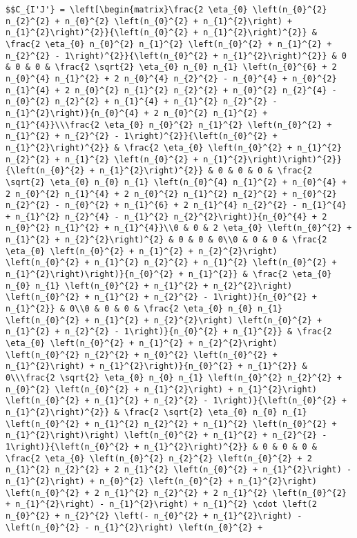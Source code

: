 \documentclass[
  letterpaper,
  DIV=11,
  numbers=noendperiod]{scrreprt}
\begin{document}
\begin{verbatim}
$$C_{I'J'} = \left[\begin{matrix}\frac{2 \eta_{0} \left(n_{0}^{2} n_{2}^{2} + n_{0}^{2} \left(n_{0}^{2} + n_{1}^{2}\right) + n_{1}^{2}\right)^{2}}{\left(n_{0}^{2} + n_{1}^{2}\right)^{2}} & \frac{2 \eta_{0} n_{0}^{2} n_{1}^{2} \left(n_{0}^{2} + n_{1}^{2} + n_{2}^{2} - 1\right)^{2}}{\left(n_{0}^{2} + n_{1}^{2}\right)^{2}} & 0 & 0 & 0 & \frac{2 \sqrt{2} \eta_{0} n_{0} n_{1} \left(n_{0}^{6} + 2 n_{0}^{4} n_{1}^{2} + 2 n_{0}^{4} n_{2}^{2} - n_{0}^{4} + n_{0}^{2} n_{1}^{4} + 2 n_{0}^{2} n_{1}^{2} n_{2}^{2} + n_{0}^{2} n_{2}^{4} - n_{0}^{2} n_{2}^{2} + n_{1}^{4} + n_{1}^{2} n_{2}^{2} - n_{1}^{2}\right)}{n_{0}^{4} + 2 n_{0}^{2} n_{1}^{2} + n_{1}^{4}}\\\frac{2 \eta_{0} n_{0}^{2} n_{1}^{2} \left(n_{0}^{2} + n_{1}^{2} + n_{2}^{2} - 1\right)^{2}}{\left(n_{0}^{2} + n_{1}^{2}\right)^{2}} & \frac{2 \eta_{0} \left(n_{0}^{2} + n_{1}^{2} n_{2}^{2} + n_{1}^{2} \left(n_{0}^{2} + n_{1}^{2}\right)\right)^{2}}{\left(n_{0}^{2} + n_{1}^{2}\right)^{2}} & 0 & 0 & 0 & \frac{2 \sqrt{2} \eta_{0} n_{0} n_{1} \left(n_{0}^{4} n_{1}^{2} + n_{0}^{4} + 2 n_{0}^{2} n_{1}^{4} + 2 n_{0}^{2} n_{1}^{2} n_{2}^{2} + n_{0}^{2} n_{2}^{2} - n_{0}^{2} + n_{1}^{6} + 2 n_{1}^{4} n_{2}^{2} - n_{1}^{4} + n_{1}^{2} n_{2}^{4} - n_{1}^{2} n_{2}^{2}\right)}{n_{0}^{4} + 2 n_{0}^{2} n_{1}^{2} + n_{1}^{4}}\\0 & 0 & 2 \eta_{0} \left(n_{0}^{2} + n_{1}^{2} + n_{2}^{2}\right)^{2} & 0 & 0 & 0\\0 & 0 & 0 & \frac{2 \eta_{0} \left(n_{0}^{2} + n_{1}^{2} + n_{2}^{2}\right) \left(n_{0}^{2} + n_{1}^{2} n_{2}^{2} + n_{1}^{2} \left(n_{0}^{2} + n_{1}^{2}\right)\right)}{n_{0}^{2} + n_{1}^{2}} & \frac{2 \eta_{0} n_{0} n_{1} \left(n_{0}^{2} + n_{1}^{2} + n_{2}^{2}\right) \left(n_{0}^{2} + n_{1}^{2} + n_{2}^{2} - 1\right)}{n_{0}^{2} + n_{1}^{2}} & 0\\0 & 0 & 0 & \frac{2 \eta_{0} n_{0} n_{1} \left(n_{0}^{2} + n_{1}^{2} + n_{2}^{2}\right) \left(n_{0}^{2} + n_{1}^{2} + n_{2}^{2} - 1\right)}{n_{0}^{2} + n_{1}^{2}} & \frac{2 \eta_{0} \left(n_{0}^{2} + n_{1}^{2} + n_{2}^{2}\right) \left(n_{0}^{2} n_{2}^{2} + n_{0}^{2} \left(n_{0}^{2} + n_{1}^{2}\right) + n_{1}^{2}\right)}{n_{0}^{2} + n_{1}^{2}} & 0\\\frac{2 \sqrt{2} \eta_{0} n_{0} n_{1} \left(n_{0}^{2} n_{2}^{2} + n_{0}^{2} \left(n_{0}^{2} + n_{1}^{2}\right) + n_{1}^{2}\right) \left(n_{0}^{2} + n_{1}^{2} + n_{2}^{2} - 1\right)}{\left(n_{0}^{2} + n_{1}^{2}\right)^{2}} & \frac{2 \sqrt{2} \eta_{0} n_{0} n_{1} \left(n_{0}^{2} + n_{1}^{2} n_{2}^{2} + n_{1}^{2} \left(n_{0}^{2} + n_{1}^{2}\right)\right) \left(n_{0}^{2} + n_{1}^{2} + n_{2}^{2} - 1\right)}{\left(n_{0}^{2} + n_{1}^{2}\right)^{2}} & 0 & 0 & 0 & \frac{2 \eta_{0} \left(n_{0}^{2} n_{2}^{2} \left(n_{0}^{2} + 2 n_{1}^{2} n_{2}^{2} + 2 n_{1}^{2} \left(n_{0}^{2} + n_{1}^{2}\right) - n_{1}^{2}\right) + n_{0}^{2} \left(n_{0}^{2} + n_{1}^{2}\right) \left(n_{0}^{2} + 2 n_{1}^{2} n_{2}^{2} + 2 n_{1}^{2} \left(n_{0}^{2} + n_{1}^{2}\right) - n_{1}^{2}\right) + n_{1}^{2} \cdot \left(2 n_{0}^{2} + n_{2}^{2} \left(- n_{0}^{2} + n_{1}^{2}\right) - \left(n_{0}^{2} - n_{1}^{2}\right) \left(n_{0}^{2} + 
\end{verbatim}
\end{document}

